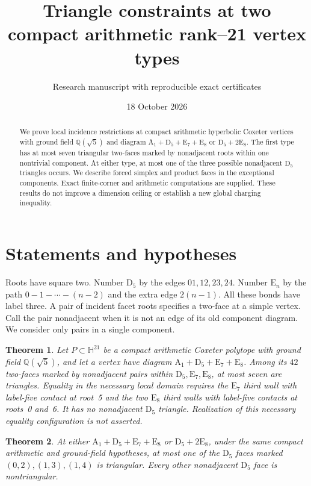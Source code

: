 \documentclass[11pt]{article}
\title{Triangle constraints at two compact arithmetic rank--21 vertex types}
\author{Research manuscript with reproducible exact certificates}
\date{18 October 2026}
\newtheorem{theorem}{Theorem}
\newcommand{\E}{\mathrm E}
\newcommand{\D}{\mathrm D}
\newcommand{\A}{\mathrm A}
\begin{document}
\maketitle
\begin{abstract}
We prove local incidence restrictions at compact arithmetic hyperbolic
Coxeter vertices with ground field $\mathbb Q(\sqrt5)$ and diagram
$\A_1+\D_5+\E_7+\E_8$ or $\D_5+2\E_8$.
The first type has at most seven triangular two-faces marked by
nonadjacent roots within one nontrivial component. At either type, at
most one of the three possible nonadjacent $\D_5$ triangles occurs.
We describe forced simplex and product faces in the exceptional
components. Exact finite-corner and arithmetic computations are supplied.
These results do not improve a dimension ceiling or establish a new
global charging inequality.
\end{abstract}

\section{Statements and hypotheses}
Roots have square two. Number $\D_5$ by the edges $01,12,23,24$.
Number $\E_n$ by the path $0-1-\cdots-(n-2)$ and the extra edge
$2(n-1)$. All these bonds have label three.
A pair of incident facet roots specifies a two-face at a simple vertex.
Call the pair nonadjacent when it is not an edge of its old component
diagram. We consider only pairs in a single component.

\begin{theorem}\label{thm:seven}
Let $P\subset\mathbb H^{21}$ be a compact arithmetic Coxeter polytope
with ground field $\mathbb Q(\sqrt5)$, and let a vertex have diagram
$\A_1+\D_5+\E_7+\E_8$. Among its $42$ two-faces marked by nonadjacent
pairs within $\D_5,\E_7,\E_8$, at most seven are triangles.
Equality in the necessary local domain requires the $\E_7$ third wall
with label-five contact at root~5 and the two $\E_8$ third walls with
label-five contacts at roots~0 and~6. It has no nonadjacent $\D_5$
triangle. Realization of this necessary equality configuration is not asserted.
\end{theorem}

\begin{theorem}\label{thm:d5}
At either $\A_1+\D_5+\E_7+\E_8$ or $\D_5+2\E_8$, under the same
compact arithmetic and ground-field hypotheses, at most one of the
$\D_5$ faces marked $(0,2),(1,3),(1,4)$ is triangular. Every other
nonadjacent $\D_5$ face is nontriangular.
\end{theorem}
\end{document}
